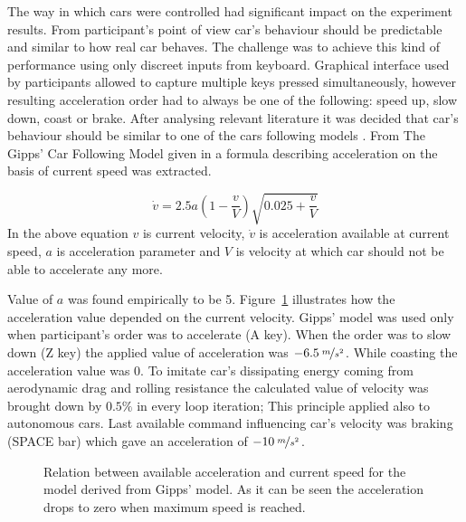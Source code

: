 \documentclass[11pt,english,twoside]{article}
\begin{document}
The way in which cars were controlled had significant impact on the experiment results. From participant's point of view car's behaviour should be predictable and similar to how real car behaves. The challenge was to achieve this kind of performance using only discreet inputs from keyboard. Graphical interface used by participants allowed to capture multiple keys pressed simultaneously, however resulting acceleration order had to always be one of the following: speed up, slow down, coast or brake. After analysing relevant literature it was decided that car's behaviour should be similar to one of the cars following models \citep{treiber2013traffic}. From The Gipps' Car Following Model given in \citet{spyropoulou2007simulation} a formula describing acceleration on the basis of current speed was extracted.

\begin{equation}
\dot{v}=2.5a(1- \frac{v}{V})\sqrt{0.025+ \frac{v}{V}}
\end{equation}
In the above equation $v$ is current velocity, $\dot{v}$ is acceleration available at current speed, $a$ is acceleration parameter and $V$ is velocity at which car should not be able to accelerate any more.

Value of $a$ was found empirically to be 5. Figure~\ref{fig:gipps} illustrates how the acceleration value depended on the current velocity. Gipps' model was used only when participant's order was to accelerate (A key). When the order was to slow down (Z key) the applied value of acceleration was $-6.5\:\nicefrac{m}{s^2}$. While coasting the acceleration value was $0$. To imitate car's dissipating energy coming from aerodynamic drag and rolling resistance the calculated value of velocity was brought down by $0.5\%$ in every loop iteration; This principle applied also to autonomous cars. Last available command influencing car's velocity was braking (SPACE bar) which gave an acceleration of $-10\:\nicefrac{m}{s^2}$.


\begin{figure}[!] %
\caption{Relation between available acceleration and current speed for the model derived from Gipps' model. As it can be seen the acceleration drops to zero when maximum speed is reached.}
\label{fig:gipps}
\end{figure} 
\end{document}
